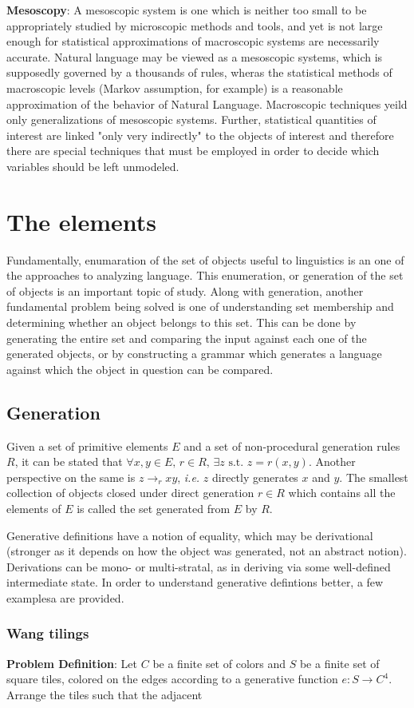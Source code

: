 \documentclass{report}
\begin{document}
\textbf{Mesoscopy}: A mesoscopic system is one which is neither too small to be
appropriately studied by microscopic methods and tools, and yet is not large
enough for statistical approximations of macroscopic systems are necessarily
accurate. Natural language may be viewed as a mesoscopic systems, which is
supposedly governed by a thousands of rules, wheras the statistical methods of
macroscopic levels (Markov assumption, for example) is a reasonable
approximation of the behavior of Natural Language. Macroscopic techniques yeild
only generalizations of mesoscopic systems. Further, statistical quantities
of interest are linked "only very indirectly" to the objects of interest and
therefore there are special techniques that must be employed in order to decide
which variables should be left unmodeled.

\chapter{The elements}

Fundamentally, enumaration of the set of objects useful to linguistics is an
one of the approaches to analyzing language. This enumeration, or generation
of the set of objects is an important topic of study. Along with generation,
another fundamental problem being solved is one of understanding set membership
and determining whether an object belongs to this set. This can be done by
generating the entire set and comparing the input against each one of the
generated objects, or by constructing a grammar which generates a language
against which the object in question can be compared.

\section{Generation}

Given a set of primitive elements $E$ and a set of non-procedural generation
rules $R$, it can be stated that $\forall x, y \in E,\, r \in R,\, \exists z
\text{ s.t. } z = r(x,y)$. Another perspective on the same is $z \rightarrow_r
xy$, \textit{i.e.} $z$ directly generates $x$ and $y$. The smallest collection
of objects closed under direct generation $r \in R$ which contains all the
elements of $E$ is called the set generated from $E$ by $R$.

Generative definitions have a notion of equality, which may be derivational
(stronger as it depends on how the object was generated, not an abstract
notion). Derivations can be mono- or multi-stratal, as in deriving via some
well-defined intermediate state. In order to understand generative defintions
better, a few examplesa are provided.

\subsection{Wang tilings}

\textbf{Problem Definition}: Let $C$ be a finite set of colors and $S$ be a
finite set of square tiles, colored on the edges according to a generative
function $e : S \rightarrow C^4 $. Arrange the tiles such that the adjacent
\end{document}
